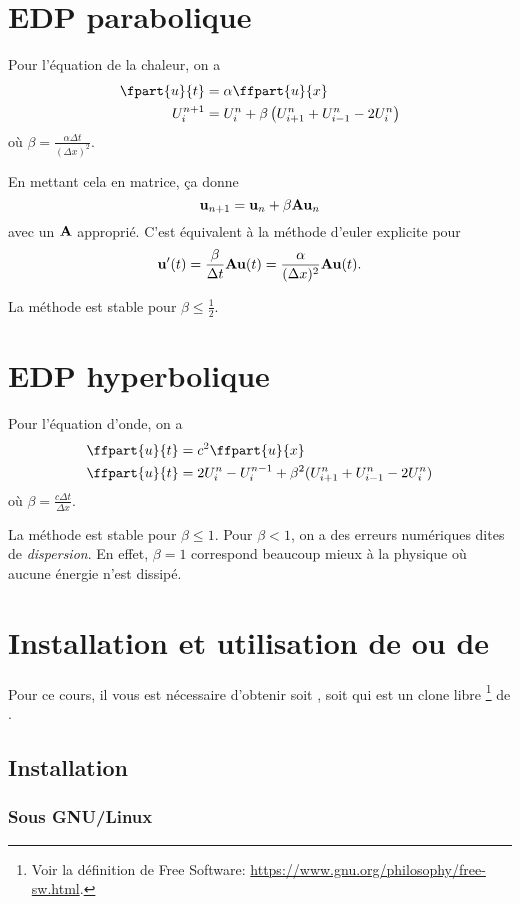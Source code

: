 \section{EDP parabolique}
Pour l'équation de la chaleur, on a
\begin{align*}
  \fpart{u}{t} & = \alpha \ffpart{u}{x}\\
  U_i^{n+1} & = U_i^n + \beta \left(U_{i+1}^n + U_{i-1}^n - 2U_i^n\right)
\end{align*}
où $\beta = \frac{\alpha\Delta t}{(\Delta x)^2}$.

En mettant cela en matrice, ça donne
\[ {\bf u}_{n+1} = {\bf u}_n + \beta {\bf A}{\bf u}_n \]
avec un ${\bf A}$ approprié.
C'est équivalent à la méthode d'euler explicite pour
\[ {\bf u}'(t) =
\frac{\beta}{\Delta t}{\bf A}{\bf u}(t) =
\frac{\alpha}{(\Delta x)^2}{\bf A}{\bf u}(t). \]

La méthode est stable pour $\beta \leq \frac{1}{2}$.

\section{EDP hyperbolique}
Pour l'équation d'onde, on a
\begin{align*}
  \ffpart{u}{t} & = c^2 \ffpart{u}{x}\\
  \ffpart{u}{t} & = 2U_i^n - U_i^{n-1} + \beta^2
  (U_{i+1}^n + U_{i-1}^n - 2U_i^n)
\end{align*}
où $\beta = \frac{c\Delta t}{\Delta x}$.

La méthode est stable pour $\beta \leq 1$.
Pour $\beta < 1$, on a des erreurs numériques dites de \emph{dispersion}.
En effet, $\beta = 1$ correspond beaucoup mieux à la physique où
aucune énergie n'est dissipé.

\annexe
\section{Installation et utilisation de \matlab{} ou de \octave{}}
Pour ce cours, il vous est nécessaire d'obtenir soit \matlab{},
soit \octave{} qui est un clone libre
\footnote{Voir la définition de Free Software:
  \url{https://www.gnu.org/philosophy/free-sw.html}.}
de \matlab{}.

\subsection{Installation}
\subsubsection{Sous GNU/Linux}
